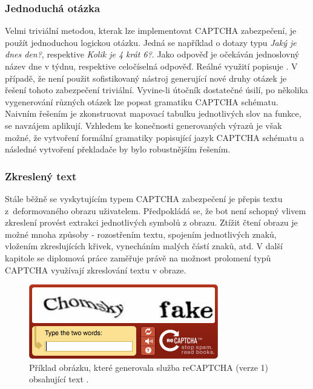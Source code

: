 \documentclass[
  field=ainfp,
  master=true,
  biblatex,
  sourcecodes=false,
  theorems=false,
  glossaries,
  index
]{kidiplom}
\begin{document}
\subsubsection*{Jednoduchá otázka}
Velmi triviální metodou, kterak lze implementovat CAPTCHA zabezpečení, je použít jednoduchou logickou otázku. Jedná se například o dotazy typu \textit{Jaký je dnes den?}, respektive \textit{Kolik je 4 krát 6?}. Jako odpověď je očekáván jednoslovný název dne v týdnu, respektive celočíselná odpověď. Reál\-né využití popisuje \cite{web:textcaptcha}. V případě, že není použit sofistikovaný nástroj generující nové druhy otázek je řešení tohoto zabezpečení triviální. Vyvine-li útočník dostatečné úsilí, po několika vygenerování různých otázek lze popsat gramatiku CAPTCHA schématu. Naivním řešením je zkonstruovat mapovací tabulku jednotlivých slov na funkce, se navzájem aplikují. Vzhledem ke konečnosti generovaných výrazů je však možné, že vytvoření formální gramatiky popisující jazyk CAPTCHA schématu a následné vytvoření překladače by bylo robustnějším řešením. 

\subsubsection*{Zkreslený text}
Stále běžně se vyskytujícím typem CAPTCHA zabezpečení je přepis textu z~deformovaného obrazu uživatelem. Předpokládá se, že bot není schopný vlivem zkreslení provést extrakci jednotlivých symbolů z obrazu. Ztížit čtení obrazu je možné mnoha způsoby - rozostřením textu, spojením jednotlivých znaků, vložením zkreslujících křivek, vynecháním malých částí znaků, atd. V další kapitole se diplomová práce zaměřuje právě na možnost prolomení typů CAPTCHA využívají zkreslování textu v obraze.

\begin{figure}[H]
  \centering
  \includegraphics[scale=0.8]{images/text_image_captcha.jpg}
  \caption{Příklad obrázku, které generovala služba reCAPTCHA (verze 1) obsahující text .}
  \label{fig:captcha_text_image}
\end{figure}
\end{document}
